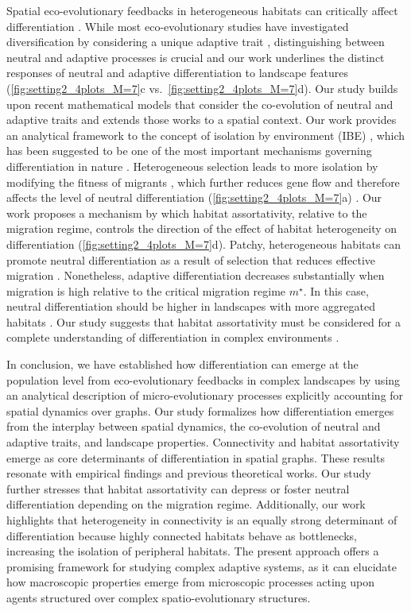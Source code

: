 Spatial eco-evolutionary feedbacks in heterogeneous habitats can critically affect differentiation \citep{Richardson2014}.
%
While most eco-evolutionary studies have investigated diversification by considering a unique adaptive trait \citep{Doebeli2003,Kirkpatrick1997,Polechova2015,Polechova2018}, distinguishing between neutral and adaptive processes is crucial \citep{Holderegger2006} and our work underlines the distinct responses of neutral and adaptive differentiation to landscape features (\cref{fig:setting2_4plots_M=7}c vs.\ \cref{fig:setting2_4plots_M=7}d).
%
Our study builds upon recent mathematical models that consider the co-evolution of neutral and adaptive traits \citep{Billiard2015,Anceschi2019} and extends those works to a spatial context. Our work provides an analytical framework to the concept of isolation by environment (IBE) \citep{Orsini2013}, which has been suggested to be one of the most important mechanisms governing differentiation in nature \citep{Wang2014}.
%
Heterogeneous selection leads to more isolation by modifying the fitness of migrants \citep{Polechova2018}, which further reduces gene flow \citep{Richardson2014} and therefore affects the level of neutral differentiation (\cref{fig:setting2_4plots_M=7}a) \citep{GARANT2007}.
%
Our work proposes a mechanism by which habitat assortativity, relative to the migration regime, controls the direction of the effect of habitat heterogeneity on differentiation (\cref{fig:setting2_4plots_M=7}d).
%
Patchy, heterogeneous habitats can promote neutral differentiation as a result of selection that reduces effective migration \citep{Stein2014}. Nonetheless, adaptive differentiation decreases substantially when migration is high relative to the critical migration regime $m^\star$. In this case, neutral differentiation should be higher in landscapes with more aggregated habitats \citep{Richardson2014}.
%
Our study suggests that habitat assortativity must be considered for a complete understanding of differentiation in complex environments \citep{Stein2014}. 

In conclusion, we have established how differentiation can emerge at the population level from eco-evolutionary feedbacks in complex landscapes by using an analytical description of micro-evolutionary processes explicitly accounting for spatial dynamics over graphs.
%
Our study formalizes how differentiation emerges from the interplay between spatial dynamics, the co-evolution of neutral and adaptive traits, and landscape properties.
%
Connectivity and habitat assortativity emerge as core determinants of differentiation in spatial graphs. These results resonate with empirical findings and previous theoretical works. Our study further stresses that habitat assortativity can depress or foster neutral differentiation depending on the migration regime.
%
Additionally, our work highlights that heterogeneity in connectivity is an equally strong determinant of differentiation because highly connected habitats behave as bottlenecks, increasing the isolation of peripheral habitats.
%
The present approach offers a promising framework for studying complex adaptive systems, as it can elucidate how macroscopic properties emerge from microscopic processes acting upon agents structured over complex spatio-evolutionary structures.

